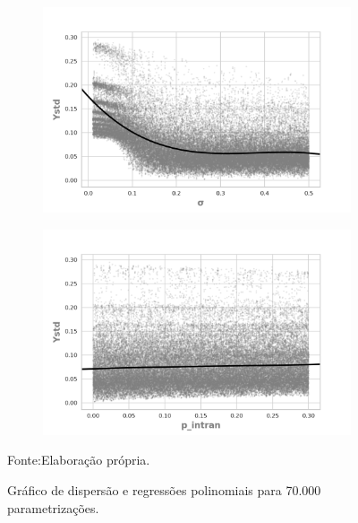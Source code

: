 \begin{figure}[H]
                \begin{subfigure}[b]{0.49\textwidth}
            \includegraphics[width=\textwidth]{ims/nlregressions/nlregressionmutatingosigma.png}
          \end{subfigure}
                \begin{subfigure}[b]{0.49\textwidth}
            \includegraphics[width=\textwidth]{ims/nlregressions/nlregressionmutatingop_intran.png}
    \end{subfigure}
    \caption{Gráfico de dispersão e regressões polinomiais para 70.000 parametrizações.}
    \label{fig:scatter2}
    Fonte:Elaboração própria.
\end{figure}
